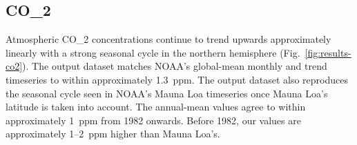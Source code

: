 \subsection{CO_2}
\label{ssec:results-co2}

Atmospheric CO_2 concentrations continue to trend upwards approximately linearly
with a strong seasonal cycle in the northern hemisphere (Fig.~\ref{fig:results-co2}).
The output dataset matches NOAA's global-mean monthly and trend timeseries \citep{lan_co2-trends_2026} to within approximately 1.3~ppm.
The output dataset also reproduces the seasonal cycle seen in NOAA's Mauna Loa timeseries
\citep[which uses data from the Scripps CO_2 program before May 1974,][]{lan_co2-trends_2026,keeling_co2-exchanges_2001}
once Mauna Loa's latitude is taken into account.
The annual-mean values agree to within approximately 1~ppm from 1982 onwards.
Before 1982, our values are approximately 1--2~ppm higher than Mauna Loa's.
